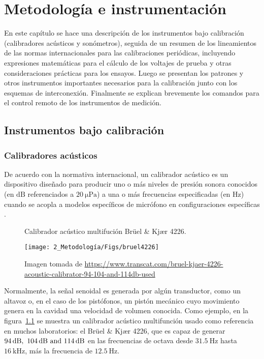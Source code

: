 
\chapter{Metodología e instrumentación}

En este capítulo se hace una descripción de los instrumentos bajo calibración (calibradores acústicos y sonómetros), seguida de un resumen de los lineamientos de las normas internacionales para las calibraciones periódicas, incluyendo expresiones matemáticas para el cálculo de los voltajes de prueba y otras consideraciones prácticas para los ensayos.
Luego se presentan los patrones y otros instrumentos importantes necesarios para la calibración junto con los esquemas de interconexión.
Finalmente se explican brevemente los comandos para el control remoto de los instrumentos de medición.


\section{Instrumentos bajo calibración}

\subsection{Calibradores acústicos}
De acuerdo con la normativa internacional, un calibrador acústico es un dispositivo diseñado para producir uno o más niveles de presión sonora conocidos (en $\unit{\dB}$ referenciados a $\qty{20}{\micro\Pa}$) a una o más frecuencias especificadas (en $\unit{\Hz}$) cuando se acopla a modelos específicos de micrófono en configuraciones específicas .
%
\begin{figure}[!h]
    \caption{Calibrador acústico multifución Brüel \& Kjær 4226.}
    \label{fig:bruel_4226}
    \centering
    \texttt{[image: 2\_Metodología/Figs/bruel4226]}
    \caption*{\footnotesize Imagen tomada de \scriptsize
    \url{https://www.transcat.com/bruel-kjaer-4226-acoustic-calibrator-94-104-and-114db-used}}
\end{figure}

Normalmente, la señal senoidal es generada por algún transductor, como un altavoz o, en el caso de los pistófonos, un pistón mecánico cuyo movimiento genera en la cavidad una velocidad de volumen conocida.
Como ejemplo, en la figura~\ref{fig:bruel_4226} se muestra un calibrador acústico multifunción usado como referencia en muchos laboratorios: el Brüel \& Kjær 4226, que es capaz de generar $\qtylist{94; 104; 114}{\dB}$ en las frecuencias de octava desde $\qty{31.5}{\Hz}$ hasta $\qty{16}{\kHz}$, más la frecuencia de $\qty{12.5}{\Hz}$.

